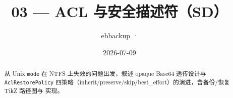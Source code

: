 \documentclass[12pt,a4paper]{ctexart}
\title{03 — ACL 与安全描述符（SD）}
\author{ebbackup · \filepath{win\_meta.cc}}
\date{2026-07-09}
\begin{document}
\maketitle
\begin{abstract}
从 Unix \texttt{mode} 在 NTFS 上失效的问题出发，叙述 opaque  Base64 透传设计与
\texttt{AclRestorePolicy} 四策略（inherit/preserve/skip/best\_effort）的演进，含备份/恢复 TikZ 路径图与  实现。
\end{abstract}
\tableofcontents
\newpage

\end{document}
